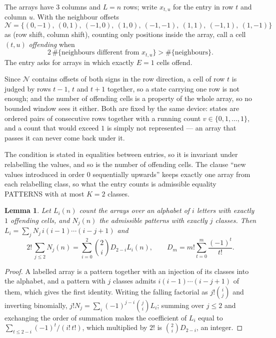 \documentclass[11pt,a4paper]{article}
\theoremstyle{plain}
\newtheorem{lemma}[theorem]{Lemma}
\theoremstyle{definition}
\begin{document}
The arrays have $3$ columns and $L=n$ rows; write $x_{t,u}$ for the entry in
row $t$ and column $u$. With the neighbour offsets
\[
\mathcal N=\{(0,-1),\ (0,1),\ (-1,0),\ (1,0),\ (-1,-1),\ (1,1),\ (-1,1),\ (1,-1)\}
\]
as (row shift, column shift), counting only positions inside the array, call a cell
$(t,u)$ \emph{offending} when
\[
2\,\#\{\text{neighbours different from }x_{t,u}\}>\#\{\text{neighbours}\} .
\]
The entry asks for arrays in which exactly $E=1$ cells offend.

Since $\mathcal N$ contains offsets of both signs in the row direction, a cell of row
$t$ is judged by rows $t-1$, $t$ and $t+1$ together, so a state carrying one row is not
enough; and the number of offending cells is a property of the whole array, so no bounded
window sees it either. Both are fixed by the same device: states are ordered pairs of
consecutive rows together with a running count $v\in\{0,1,\dots,1\}$, and a count that
would exceed $1$ is simply not represented --- an array that passes it can never come back
under it.

The condition is stated in equalities between entries, so it is invariant under relabelling
the values, and so is the number of offending cells. The clause ``new values introduced in
order $0$ sequentially upwards'' keeps exactly one array from each relabelling class, so what
the entry counts is admissible equality PATTERNS with at most $K=2$ classes.

\begin{lemma}\label{lem:inv}
Let $L_i(n)$ count the arrays over an alphabet of $i$ letters with exactly $1$ offending
cells, and $N_j(n)$ the admissible patterns with exactly $j$ classes. Then
$L_i=\sum_j N_j\,i(i-1)\cdots(i-j+1)$ and
\[
2!\,\sum_{j\le2}N_j(n)=\sum_{i=0}^{2}\binom{2}{i}D_{2-i}L_i(n),
\qquad D_m=m!\sum_{t=0}^{m}\frac{(-1)^t}{t!} .
\]
\end{lemma}

\begin{proof}
A labelled array is a pattern together with an injection of its classes into the alphabet,
and a pattern with $j$ classes admits $i(i-1)\cdots(i-j+1)$ of them, which gives the first
identity. Writing the falling factorial as $j!\binom{i}{j}$ and inverting binomially,
$j!N_j=\sum_i(-1)^{j-i}\binom{j}{i}L_i$; summing over $j\le2$ and exchanging the
order of summation makes the coefficient of $L_i$ equal to
$\sum_{t\le2-i}(-1)^t/(i!\,t!)$, which multiplied by $2!$ is
$\binom{2}{i}D_{2-i}$, an integer.
\end{proof}
\end{document}

